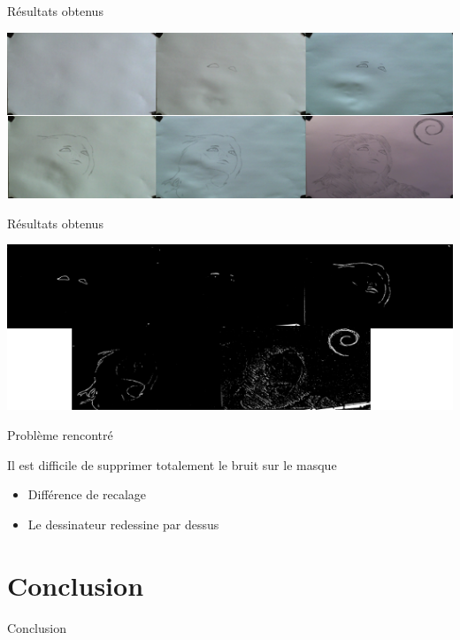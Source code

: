 \documentclass[t,14pt]{beamer}
\begin{document}
\begin{frame}{Résultats obtenus}
\vspace{5mm}
\begin{center}
\includegraphics[width=\textwidth]{images/evo/evo.png}
\end{center}
\end{frame}
\begin{frame}{Résultats obtenus}
\vspace{5mm}
\begin{center}
\includegraphics[width=\textwidth]{images/evo/evomasque.png}
\end{center}
\end{frame}
			
\begin{frame}{Problème rencontré}
\vspace{5mm}
\begin{block}{}
Il est difficile de supprimer totalement le bruit sur le masque
\end{block}
\begin{itemize}
\item Différence de recalage
\item Le dessinateur redessine par dessus
\end{itemize}
\end{frame}	

	
\section[Conclusion]{Conclusion}
	\begin{frame}{Conclusion}
		\vspace*{5mm}
		\begin{itemize}
		\end{itemize}
	\end{frame}
\end{document}
